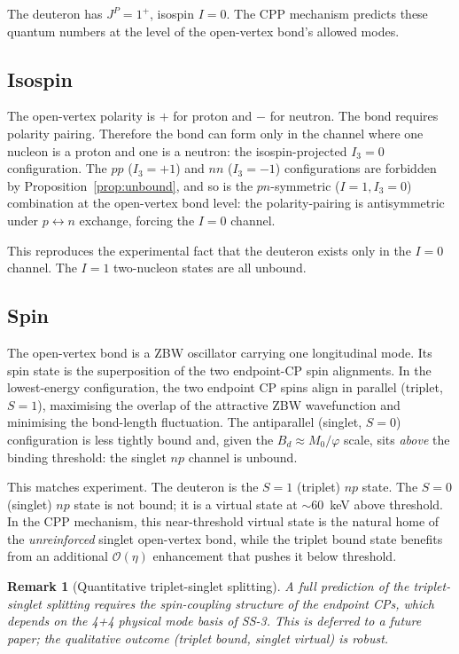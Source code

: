 \documentclass[11pt,letterpaper]{article}
\newtheorem{remark}[theorem]{Remark}
\newcommand{\phig}{\varphi}
\newcommand{\Bd}{B_{d}}
\begin{document}
The deuteron has $J^P = 1^+$, isospin $I = 0$. The CPP mechanism predicts these quantum numbers at the level of the open-vertex bond's allowed modes.

\subsection{Isospin}

The open-vertex polarity is $+$ for proton and $-$ for neutron. The bond requires polarity pairing. Therefore the bond can form only in the channel where one nucleon is a proton and one is a neutron: the isospin-projected $I_3 = 0$ configuration. The $pp$ ($I_3 = +1$) and $nn$ ($I_3 = -1$) configurations are forbidden by Proposition~\ref{prop:unbound}, and so is the $pn$-symmetric ($I = 1, I_3 = 0$) combination at the open-vertex bond level: the polarity-pairing is antisymmetric under $p \leftrightarrow n$ exchange, forcing the $I = 0$ channel.

This reproduces the experimental fact that the deuteron exists only in the $I = 0$ channel. The $I = 1$ two-nucleon states are all unbound.

\subsection{Spin}

The open-vertex bond is a ZBW oscillator carrying one longitudinal mode. Its spin state is the superposition of the two endpoint-CP spin alignments. In the lowest-energy configuration, the two endpoint CP spins align in parallel (triplet, $S = 1$), maximising the overlap of the attractive ZBW wavefunction and minimising the bond-length fluctuation. The antiparallel (singlet, $S = 0$) configuration is less tightly bound and, given the $\Bd \approx M_0/\phig$ scale, sits \emph{above} the binding threshold: the singlet $np$ channel is unbound.

This matches experiment. The deuteron is the $S = 1$ (triplet) $np$ state. The $S = 0$ (singlet) $np$ state is not bound; it is a virtual state at $\sim 60$~keV above threshold. In the CPP mechanism, this near-threshold virtual state is the natural home of the \emph{unreinforced} singlet open-vertex bond, while the triplet bound state benefits from an additional $\mathcal{O}(\eta)$ enhancement that pushes it below threshold.

\begin{remark}[Quantitative triplet-singlet splitting]
A full prediction of the triplet-singlet splitting requires the spin-coupling structure of the endpoint CPs, which depends on the 4+4 physical mode basis of SS-3. This is deferred to a future paper; the qualitative outcome (triplet bound, singlet virtual) is robust.
\end{remark}
\end{document}

